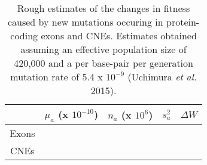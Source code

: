 


\begin{table}
\centering

\caption{Rough estimates of the changes in fitness caused by new mutations occuring in protein-coding exons and CNEs. Estimates obtained assuming an effective population size of 420,000 and a per base-pair per generation mutation rate of 5.4 x $10^{-9}$ (Uchimura \textit{et al.} 2015).}
 \begin{tabular}{c c c c c} 

  \hline
		& $\mu_a$ (x $10^{-10}$)& $n_a$ (x $10^6$)& $s_a^2$ & $\Delta W$ \\ [0.5ex] \hline
	Exons & & & &  \\
	CNEs  & & & &  \\ \hline
\end{tabular}    

\end{table}
